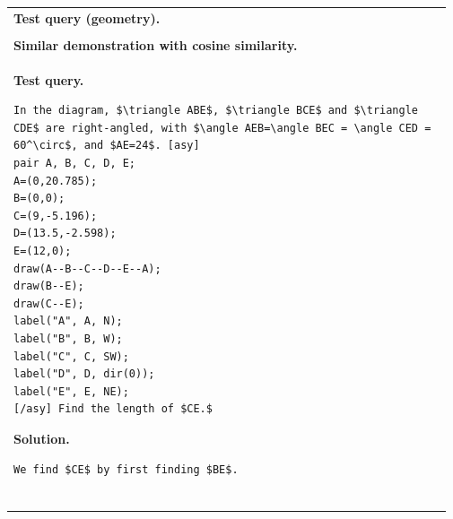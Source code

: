 \documentclass{article}
\theoremstyle{plain}
\theoremstyle{definition}
\theoremstyle{remark}
\begin{document}
\begin{table}[H]
\centering
\tiny
\begin{tabular}{p{0.97\linewidth}}
\toprule
\textbf{Test query (geometry).} 
\vspace{-2mm}
\begin{lstlisting}
In the diagram, $\triangle XYZ$ is right-angled at $X,$ with $YX=60$ and $XZ=80.$ The point $W$ is on $YZ$ so that $WX$ is perpendicular to $YZ.$ Determine the length of $WZ.$ [asy]
pair X, Y, Z, W;
Y=(0,0);
X=(36,48);
Z=(100,0);
W=(36,0);
draw(X--Y--Z--X--W);
label("Y", Y, SW);
label("X", X, N);
label("W", W, S);
label("Z", Z, SE);
label("60", (X+Y)/2, NW);
label("80", (X+Z)/2, NE);
{[/asy]}\\
\end{lstlisting}
\textbf{Solution.}
\vspace{-2mm}
\begin{lstlisting}
By the Pythagorean Theorem, \begin{align*}
YZ^2 &= YX^2 + XZ^2 
&= 60^2+80^2 
&= 3600+6400 
&=10000,
\end{align*} so $YZ=100.$

(We could also have found $YZ$ without using the Pythagorean Theorem by noticing that $\triangle XYZ$ is a right-angled triangle with its right-angle at $X$ and $XY=60=3\cdot 20$ and $XZ=80=4\cdot 20.$ This means that $\triangle XYZ$ is similar to a 3-4-5 triangle, and so $YZ=5\cdot 20=100.$)

Since $\triangle YXZ$ is right-angled at $X,$ its area is $$\frac{1}{2}\cdot 60\cdot 80=2400.$$ Since $XW$ is perpendicular to $YZ,$ then the area of $\triangle YXZ$ is also equal to $$\frac{1}{2}\cdot 100\cdot XW=50XW.$$ Therefore, $50XW=2400,$ so $XW=48.$ By the Pythagorean Theorem, \begin{align*}
WZ^2 &= 80^2 - 48^2
&= 6400 - 2304
&= 4096.
\end{align*} Thus, $WZ = \sqrt{4096}=\boxed{64}.$

An alternative solution comes by noticing that $\triangle XZW$ and $\triangle YZX$ are similar. Therefore \[\frac{WZ}{XZ}=\frac{XZ}{YZ}\] or \[\frac{WZ}{80}=\frac{80}{100}=\frac45.\] This tells us that  \[WZ=\frac45\cdot80=\boxed{64}.\]
\end{lstlisting}

\\ \midrule
\textbf{Similar demonstration with cosine similarity.} \\
\textbf{Test query.} 
\vspace{-2mm}
\begin{lstlisting}
In the diagram, $\triangle ABE$, $\triangle BCE$ and $\triangle CDE$ are right-angled, with $\angle AEB=\angle BEC = \angle CED = 60^\circ$, and $AE=24$. [asy] 
pair A, B, C, D, E;
A=(0,20.785);
B=(0,0);
C=(9,-5.196);
D=(13.5,-2.598);
E=(12,0);
draw(A--B--C--D--E--A);
draw(B--E);
draw(C--E);
label("A", A, N);
label("B", B, W);
label("C", C, SW);
label("D", D, dir(0));
label("E", E, NE);
[/asy] Find the length of $CE.$
\end{lstlisting}
\textbf{Solution.}
\vspace{-2mm}
\begin{lstlisting}
We find $CE$ by first finding $BE$.


\end{lstlisting}
\end{tabular}
\end{table}
\end{document}

